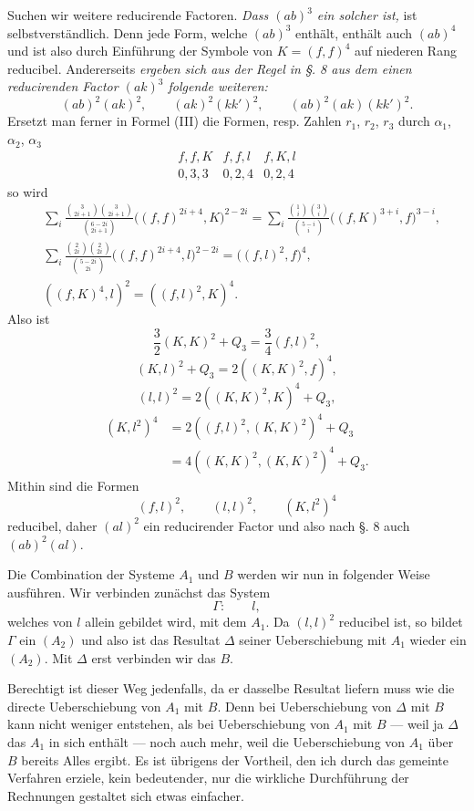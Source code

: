 \documentclass[10pt]{article}
\begin{document}
Suchen wir weitere reducirende Factoren. \textit{Dass $(ab)^3$ ein solcher ist,} ist selbstverständlich. Denn jede Form, welche $(ab)^3$ enthält, enthält auch $(ab)^4$ und ist also durch Einführung der Symbole von $K=(f,f)^4$ auf niederen Rang reducibel. Andererseits \textit{ergeben sich aus der Regel in §. 8 aus dem einen reducirenden Factor $(ak)^3$ folgende weiteren:}
\[
(ab)^2(ak)^2,
\qquad (ak)^2(kk')^2,
\qquad (ab)^2(ak)(kk')^2.
\]
Ersetzt man ferner in Formel (III) die Formen, resp. Zahlen $r_1$, $r_2$, $r_3$ durch $\alpha_1$, $\alpha_2$, $\alpha_3$
\[
\begin{array}{ccc}
f,f,K&f,f,l&f,K,l\\
0,3,3&0,2,4&0,2,4
\end{array}
\]
so wird
\begin{align*}
&\sum_i\frac{\binom{3}{2i+1}\binom{3}{2i+1}}{\binom{6-2i}{2i+1}}\bigl((f,f)^{2i+4},K\bigr)^{2-2i}
=\sum_i\frac{\binom{1}{i}\binom{3}{i}}{\binom{5-i}{i}}\bigl((f,K)^{3+i},f\bigr)^{3-i},\\
&\sum_i\frac{\binom{2}{2i}\binom{2}{2i}}{\binom{5-2i}{2i}}\bigl((f,f)^{2i+4},l\bigr)^{2-2i}=\bigl((f,l)^2,f\bigr)^4,\\
&((f,K)^4,l)^2=((f,l)^2,K)^4.
\end{align*}
Also ist
\[
\frac32(K,K)^2+Q_3=\frac34(f,l)^2,
\]
\[
(K,l)^2+Q_3=2((K,K)^2,f)^4,
\]
\[
(l,l)^2=2((K,K)^2,K)^4+Q_3,
\]
\[
\begin{aligned}
(K,l^2)^4&=2((f,l)^2,(K,K)^2)^4+Q_3\\
&=4((K,K)^2,(K,K)^2)^4+Q_3.
\end{aligned}
\]
Mithin sind die Formen
\[
(f,l)^2,
\qquad (l,l)^2,
\qquad (K,l^2)^4
\]
reducibel, daher $(al)^2$ ein reducirender Factor und also nach §. 8 auch $(ab)^2(al)$.

Die Combination der Systeme $A_1$ und $B$ werden wir nun in folgender Weise ausführen. Wir verbinden zunächst das System
\[
\Gamma:
\qquad l,
\]
welches von $l$ allein gebildet wird, mit dem $A_1$. Da $(l,l)^2$ reducibel ist, so bildet $\Gamma$ ein $(A_2)$ und also ist das Resultat $\Delta$ seiner Ueberschiebung mit $A_1$ wieder ein $(A_2)$. Mit $\Delta$ erst verbinden wir das $B$.

Berechtigt ist dieser Weg jedenfalls, da er dasselbe Resultat liefern muss wie die directe Ueberschiebung von $A_1$ mit $B$. Denn bei Ueberschiebung von $\Delta$ mit $B$ kann nicht weniger entstehen, als bei Ueberschiebung von $A_1$ mit $B$ --- weil ja $\Delta$ das $A_1$ in sich enthält --- noch auch mehr, weil die Ueberschiebung von $A_1$ über $B$ bereits Alles ergibt. Es ist übrigens der Vortheil, den ich durch das gemeinte Verfahren erziele, kein bedeutender, nur die wirkliche Durchführung der Rechnungen gestaltet sich etwas einfacher.
\end{document}
